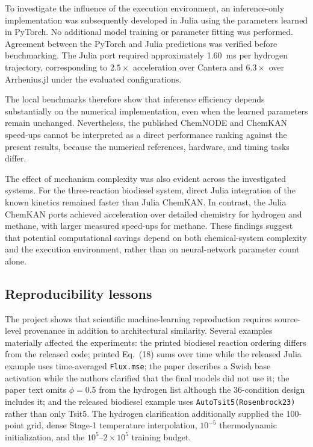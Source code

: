 \documentclass[11pt,a4paper]{article}
\begin{document}
To investigate the influence of the
execution environment, an inference-only
implementation was subsequently developed
in Julia using the parameters learned
in PyTorch. No additional model training
or parameter fitting was performed.
Agreement between the PyTorch and Julia
predictions was verified before benchmarking.
The Julia port required approximately
1.60~ms per hydrogen trajectory,
corresponding to $2.5\times$ acceleration
over Cantera and $6.3\times$ over
Arrhenius.jl under the evaluated
configurations.

The local benchmarks therefore show
that inference efficiency depends
substantially on the numerical
implementation, even when the learned
parameters remain unchanged.
Nevertheless, the published ChemNODE
and ChemKAN speed-ups cannot be
interpreted as a direct performance
ranking against the present results,
because the numerical references,
hardware, and timing tasks differ.

The effect of mechanism complexity was
also evident across the investigated
systems. For the three-reaction biodiesel
system, direct Julia integration of
the known kinetics remained faster
than Julia ChemKAN. In contrast,
the Julia ChemKAN ports achieved
acceleration over detailed chemistry
for hydrogen and methane, with larger
measured speed-ups for methane.
These findings suggest that potential
computational savings depend on both
chemical-system complexity and the
execution environment, rather than
on neural-network parameter count alone.


\subsection{Reproducibility lessons}

The project shows that scientific machine-learning reproduction requires source-level provenance in addition to architectural similarity. Several examples materially affected the experiments: the printed biodiesel reaction ordering differs from the released code; printed Eq.~(18) sums over time while the released Julia example uses time-averaged \texttt{Flux.mse}; the paper describes a Swish base activation while the authors clarified that the final models did not use it; the paper text omits $\phi=0.5$ from the hydrogen list although the 36-condition design includes it; and the released biodiesel example uses \texttt{AutoTsit5(Rosenbrock23)} rather than only Tsit5. The hydrogen clarification additionally supplied the 100-point grid, dense Stage-1 temperature interpolation, $10^{-5}$ thermodynamic initialization, and the $10^5$--$2\times10^5$ training budget.
\end{document}
